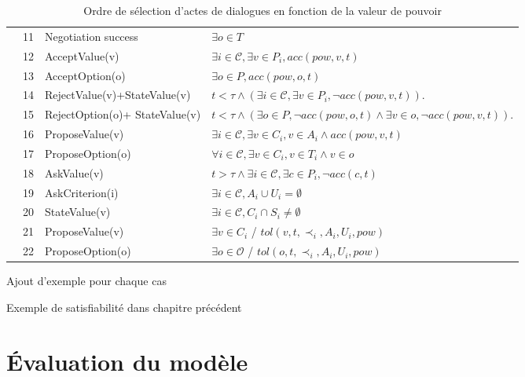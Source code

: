 \begin{table}[!t]
\begin{tabular}{|p{.5cm}|p{.9cm}|p{4cm}|p{7.5cm}|}
				\hline
				
				\parbox[t]{2mm}{
					} & 11& Negotiation success &  $\exists o \in T$ \\
				&12& AcceptValue(v) & $\exists i\in\mathcal{C}, \exists v \in P_i, acc(pow, v, t)$ \\
				&13&AcceptOption(o) & $\exists o \in P, acc(pow, o, t)$ \\
				&14&RejectValue(v)+\newline StateValue(v) & $ t<\tau \land (\exists i\in\mathcal{C}, \exists v \in P_i, \neg acc(pow,v, t))$.\\
				&15&RejectOption(o)+ \newline StateValue(v) & $ t<\tau \land (\exists o \in P,  \neg acc(pow,o, t) \land \exists v \in o, \neg acc(pow,v, t))$.\\
				&16&ProposeValue(v) &  $\exists i\in\mathcal{C}, \exists v \in C_i, v \in A_i  \land acc(pow, v, t) $\\
				&17&ProposeOption(o)  & $\forall i\in\mathcal{C},\exists v \in C_i, v \in T_i  \land v \in o$ \\
				&18&AskValue(v) & $t > \tau \land \exists i\in\mathcal{C}, \exists c \in P_i, \neg acc(c, t)$ \\
				&19&AskCriterion(i) & $\exists i\in\mathcal{C}, A_i \cup U_i= \emptyset $\\
				&20&StateValue(v) & $\exists i\in\mathcal{C}, C_i\cap S_i \neq \emptyset$	\\
				&21& ProposeValue(v) & $\exists v \in C_i$ / $tol(v, t, \prec_i, A_i, U_i, pow)$\\
				&22& ProposeOption(o) & $\exists o \in \mathcal{O}$ / $tol(o, t, \prec_i, A_i, U_i, pow)$\\
				
				\hline
			\end{tabular}
		
		\caption{Ordre de sélection d'actes de dialogues en fonction de la valeur de pouvoir}
		\label{table:uttChoice}
	\end{table}

Ajout d'exemple pour chaque cas

Exemple de satisfiabilité dans chapitre précédent


	\section{Évaluation du modèle}